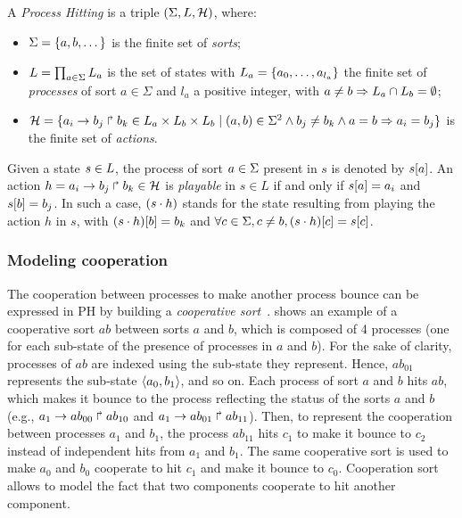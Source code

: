 \begin{definition} \label{def:PH}
A \emph{Process Hitting} is a triple $(\Sigma,L,\mathcal{H})$, where:
\begin{itemize}
\item $\Sigma = \{a,b,\dots\}$ is the finite set of \emph{sorts};
\item $L = \prod_{a\in\Sigma} L_a$ is the set of states with $L_a = \{a_0,\dots,a_{l_a}\}$
the finite set of \emph{processes} of sort $a\in\Sigma$ and $l_a$ a positive integer, with $a\neq b\Rightarrow L_a \cap L_b = \emptyset$;
\item $\mathcal{H} = \{ a_i\rightarrow b_j\Rsh b_k \in L_a \times L_b \times L_b \mid (a,b) \in \Sigma^2
  \wedge b_j\neq b_k \wedge a=b\Rightarrow a_i=b_j\}$ is the finite set of \emph{actions}.
\end{itemize}
\end{definition}

\noindent
Given a state $s\in L$, the process of sort $a\in\Sigma$ present in $s$ is denoted by ${s[a]}$.
An action $h=a_i\rightarrow b_j\Rsh b_k \in \mathcal{H}$ is \emph{playable} in $s \in L$ if and only if ${s[a]}=a_i$ and ${s[b]} = b_j$.
In such a case, $(s\cdot h)$ stands for the state resulting from playing the action $h$ in $s$, with
${(s\cdot h)[b]} = b_k$ and $\forall c \in \Sigma, c \neq b, {(s\cdot h)[c]} = {s[c]}$.

\subsubsection{Modeling cooperation}

The cooperation between processes to make another process bounce can be
expressed in PH by building a \emph{cooperative sort}~\cite{PMR10-TCSB}.
 shows an example of a cooperative sort $ab$ between sorts $a$ and $b$,
which is composed of 4 processes (one for each sub-state of the presence of processes in $a$ and $b$).
For the sake of clarity, processes of $ab$ are indexed using the sub-state they represent.
Hence, $ab_{01}$ represents the sub-state $\langle a_0,b_1 \rangle$, and so on.
Each process of sort $a$ and $b$ hits $ab$, which makes it bounce to the process reflecting the status of the sorts $a$
and $b$ (e.g., $a_1\rightarrow ab_{00}\Rsh ab_{10}$ and $a_1\rightarrow ab_{01}\Rsh ab_{11}$).
Then, to represent the cooperation between processes $a_1$ and $b_1$,
the process $ab_{11}$ hits $c_1$ to make it bounce to $c_2$ instead of
independent hits from $a_1$ and $b_1$.
The same cooperative sort is used to make $a_0$ and $b_0$ cooperate to hit $c_1$ and make it bounce to $c_0$.
Cooperation sort allows to model the fact that two components cooperate to hit another component.
